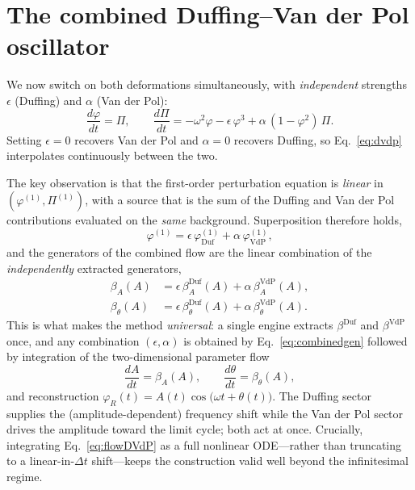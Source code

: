 \documentclass[aps,pre,twocolumn,showpacks,nofootinbib,superscriptaddress]{revtex4-2}
\newcommand{\dd}[2]{\frac{d #1}{d #2}}
\newcommand{\phiR}{\varphi_{R}}
\begin{document}
\section{The combined Duffing--Van der Pol oscillator}
\label{sec:combined}

We now switch on both deformations simultaneously, with \emph{independent}
strengths $\epsilon$ (Duffing) and $\alpha$ (Van der Pol):
\begin{equation}
  \dd{\varphi}{t}=\Pi,\qquad
  \dd{\Pi}{t}=-\omega^2\varphi-\epsilon\,\varphi^3+\alpha\,(1-\varphi^2)\,\Pi.
  \label{eq:dvdp}
\end{equation}
Setting $\epsilon=0$ recovers Van der Pol and $\alpha=0$ recovers Duffing, so
Eq.~\eqref{eq:dvdp} interpolates continuously between the two.

The key observation is that the first-order perturbation equation is
\emph{linear} in $(\varphi^{(1)},\Pi^{(1)})$, with a source that is the sum of
the Duffing and Van der Pol contributions evaluated on the \emph{same}
background. Superposition therefore holds,
\begin{equation}
  \varphi^{(1)}=\epsilon\,\varphi^{(1)}_{\mathrm{Duf}}
                +\alpha\,\varphi^{(1)}_{\mathrm{VdP}},
  \label{eq:superposition}
\end{equation}
and the generators of the combined flow are the linear combination of the
\emph{independently} extracted generators,
\begin{align}
  \beta_A(A)&=\epsilon\,\beta_A^{\mathrm{Duf}}(A)+\alpha\,\beta_A^{\mathrm{VdP}}(A),\\
  \beta_\theta(A)&=\epsilon\,\beta_\theta^{\mathrm{Duf}}(A)
                  +\alpha\,\beta_\theta^{\mathrm{VdP}}(A).
  \label{eq:combinedgen}
\end{align}
This is what makes the method \emph{universal}: a single engine extracts
$\beta^{\mathrm{Duf}}$ and $\beta^{\mathrm{VdP}}$ once, and any combination
$(\epsilon,\alpha)$ is obtained by Eq.~\eqref{eq:combinedgen} followed by
integration of the two-dimensional parameter flow
\begin{equation}
  \dd{A}{t}=\beta_A(A),\qquad \dd{\theta}{t}=\beta_\theta(A),
  \label{eq:flowDVdP}
\end{equation}
and reconstruction $\phiR(t)=A(t)\cos\!\bigl(\omega t+\theta(t)\bigr)$. The
Duffing sector supplies the (amplitude-dependent) frequency shift while the Van
der Pol sector drives the amplitude toward the limit cycle; both act at once.
Crucially, integrating Eq.~\eqref{eq:flowDVdP} as a full nonlinear ODE---rather
than truncating to a linear-in-$\Delta t$ shift---keeps the construction valid
well beyond the infinitesimal regime.
\end{document}
